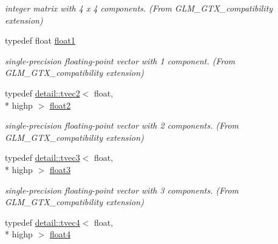 \begin{DoxyCompactItemize}
\begin{DoxyCompactList}\small\item\em integer matrix with 4 x 4 components. (From G\-L\-M\-\_\-\-G\-T\-X\-\_\-compatibility extension) \end{DoxyCompactList}\item 
\hypertarget{group__gtx__compatibility_gae0ad1b0450320cda98bbbecb56bc3167}{typedef float \hyperlink{group__gtx__compatibility_gae0ad1b0450320cda98bbbecb56bc3167}{float1}}\label{group__gtx__compatibility_gae0ad1b0450320cda98bbbecb56bc3167}

\begin{DoxyCompactList}\small\item\em single-\/precision floating-\/point vector with 1 component. (From G\-L\-M\-\_\-\-G\-T\-X\-\_\-compatibility extension) \end{DoxyCompactList}\item 
\hypertarget{group__gtx__compatibility_ga6ab0b791bbb15ef51a0e930a8710e6b1}{typedef \hyperlink{structglm_1_1detail_1_1tvec2}{detail\-::tvec2}$<$ float, \\*
highp $>$ \hyperlink{group__gtx__compatibility_ga6ab0b791bbb15ef51a0e930a8710e6b1}{float2}}\label{group__gtx__compatibility_ga6ab0b791bbb15ef51a0e930a8710e6b1}

\begin{DoxyCompactList}\small\item\em single-\/precision floating-\/point vector with 2 components. (From G\-L\-M\-\_\-\-G\-T\-X\-\_\-compatibility extension) \end{DoxyCompactList}\item 
\hypertarget{group__gtx__compatibility_ga7e0d8fa3501c0a7eaaca31adb6e02de2}{typedef \hyperlink{structglm_1_1detail_1_1tvec3}{detail\-::tvec3}$<$ float, \\*
highp $>$ \hyperlink{group__gtx__compatibility_ga7e0d8fa3501c0a7eaaca31adb6e02de2}{float3}}\label{group__gtx__compatibility_ga7e0d8fa3501c0a7eaaca31adb6e02de2}

\begin{DoxyCompactList}\small\item\em single-\/precision floating-\/point vector with 3 components. (From G\-L\-M\-\_\-\-G\-T\-X\-\_\-compatibility extension) \end{DoxyCompactList}\item 
\hypertarget{group__gtx__compatibility_gac0676d140051809309ca683c325bf439}{typedef \hyperlink{structglm_1_1detail_1_1tvec4}{detail\-::tvec4}$<$ float, \\*
highp $>$ \hyperlink{group__gtx__compatibility_gac0676d140051809309ca683c325bf439}{float4}}\label{group__gtx__compatibility_gac0676d140051809309ca683c325bf439}


\end{DoxyCompactItemize}
